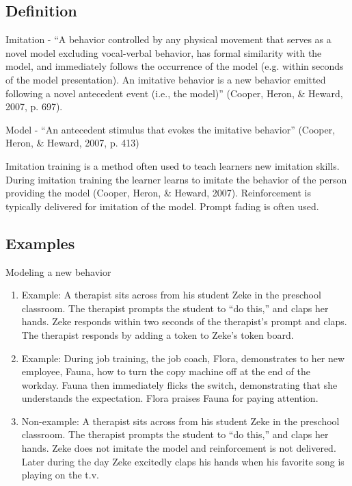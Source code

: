 \subsection{Definition}
Imitation - ``A behavior controlled by any physical movement that serves as a novel model excluding vocal-verbal behavior, has formal similarity with the model, and immediately follows the occurrence of the model (e.g. within seconds of the model presentation).  An imitative behavior is a new behavior emitted following a novel antecedent event (i.e., the model)'' (Cooper, Heron, \& Heward, 2007, p. 697).

Model - ``An antecedent stimulus that evokes the imitative behavior'' (Cooper, Heron, \& Heward, 2007, p. 413)

Imitation training is a method often used to teach learners new imitation skills.  During imitation training the learner learns to imitate the behavior of the person providing the model (Cooper, Heron, \& Heward, 2007). Reinforcement is typically delivered for imitation of the model. Prompt fading is often used.  

\subsection{Examples} Modeling a new behavior
\begin{enumerate}
\item Example: A therapist sits across from his student Zeke in the preschool classroom.  The therapist prompts the student to ``do this,'' and claps her hands.  Zeke responds within two seconds of the therapist's prompt and claps.  The therapist responds by adding a token to Zeke's token board.
\item Example:  During job training, the job coach, Flora, demonstrates to her new employee, Fauna, how to turn the copy machine off at the end of the workday.  Fauna then immediately flicks the switch, demonstrating that she understands the expectation.  Flora praises Fauna for paying attention.  
\item Non-example: A therapist sits across from his student Zeke in the preschool classroom.  The therapist prompts the student to ``do this,'' and claps her hands.  Zeke does not imitate the model and reinforcement is not delivered.  Later during the day Zeke excitedly claps his hands when his favorite song is playing on the t.v.
\end{enumerate}
%

